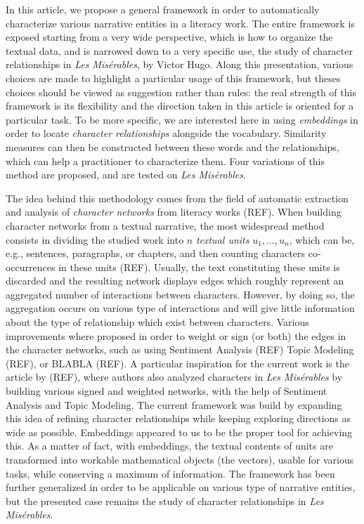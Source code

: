 \documentclass[
twocolumn,
]{ceurart}
\begin{document}
In this article, we propose a general framework in order to automatically characterize various narrative entities in a literacy work. The entire framework is exposed starting from a very wide perspective, which is how to organize the textual data, and is narrowed down to a very specific use, the study of character relationships in \emph{Les Misérables}, by Victor Hugo. Along this presentation, various choices are made to highlight a particular usage of this framework, but theses choices should be viewed as suggestion rather than rules: the real strength of this framework is its flexibility and the direction taken in this article is oriented for a particular task. To be more specific, we are interested here in using \emph{embeddings} in order to locate \emph{character relationships} alongside the vocabulary. Similarity measures can then be constructed between these words and the relationships, which can help a practitioner to characterize them. Four variations of this method are proposed, and are tested on \emph{Les Misérables}.

The idea behind this methodology comes from the field of automatic extraction and analysis of \emph{character networks} from literacy works (REF). When building character networks from a textual narrative, the most widespread method consists in dividing the studied work into $n$ \emph{textual units} $u_1, \ldots, u_n$, which can be, e.g., sentences, paragraphs, or chapters, and then counting characters co-occurrences in these units (REF). Usually, the text constituting these units is discarded and the resulting network displays edges which roughly represent an aggregated number of interactions between characters. However, by doing so, the aggregation occurs on various type of interactions and will give little information about the type of relationship which exist between characters. Various improvements where proposed in order to weight or sign (or both) the edges in the character networks, such as using Sentiment Analysis (REF) Topic Modeling (REF), or BLABLA (REF). A particular inspiration for the current work is the article by (REF), where authors also analyzed characters in \emph{Les Misérables} by building various signed and weighted networks, with the help of Sentiment Analysis and Topic Modeling. The current framework was build by expanding this idea of refining character relationships while keeping exploring directions as wide as possible. Embeddings appeared to us to be the proper tool for achieving this. As a matter of fact, with embeddings, the textual contents of units are transformed into workable mathematical objects (the vectors), usable for various tasks, while conserving a maximum of information. The framework has been further generalized in order to be applicable on various type of narrative entities, but the presented case remains the study of character relationships in \emph{Les Misérables}. 
\end{document}
